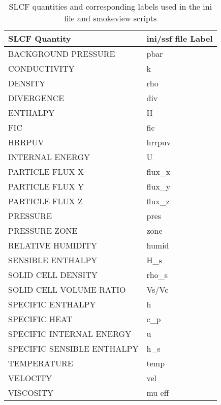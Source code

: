 \begin{table}[bph]
\begin{center}
\caption{SLCF quantities and corresponding labels used in the ini file and smokeview scripts}
\vspace{0.1in}
\begin{tabular}{|l|l|}
\hline
SLCF Quantity & ini/ssf file Label \\ \hline
{\ct  BACKGROUND PRESSURE } & {\ct   pbar } \\ \hline
{\ct  CONDUCTIVITY } & {\ct   k } \\ \hline
{\ct  DENSITY } & {\ct   rho } \\ \hline
{\ct  DIVERGENCE } & {\ct   div } \\ \hline
{\ct  ENTHALPY } & {\ct   H } \\ \hline
{\ct  FIC } & {\ct   fic } \\ \hline
{\ct  HRRPUV } & {\ct   hrrpuv } \\ \hline
{\ct  INTERNAL ENERGY } & {\ct   U } \\ \hline
{\ct  PARTICLE FLUX X } & {\ct   flux\_x } \\ \hline
{\ct  PARTICLE FLUX Y } & {\ct   flux\_y } \\ \hline
{\ct  PARTICLE FLUX Z } & {\ct   flux\_z } \\ \hline
{\ct  PRESSURE } & {\ct   pres } \\ \hline
{\ct  PRESSURE ZONE } & {\ct   zone } \\ \hline
{\ct  RELATIVE HUMIDITY } & {\ct   humid } \\ \hline
{\ct  SENSIBLE ENTHALPY } & {\ct   H\_s } \\ \hline
{\ct  SOLID CELL DENSITY } & {\ct   rho\_s } \\ \hline
{\ct  SOLID CELL VOLUME RATIO } & {\ct   Vs/Vc } \\ \hline
{\ct  SPECIFIC ENTHALPY } & {\ct   h } \\ \hline
{\ct  SPECIFIC HEAT } & {\ct   c\_p } \\ \hline
{\ct  SPECIFIC INTERNAL ENERGY } & {\ct   u } \\ \hline
{\ct  SPECIFIC SENSIBLE ENTHALPY } & {\ct   h\_s } \\ \hline
{\ct  TEMPERATURE } & {\ct   temp } \\ \hline
{\ct  VELOCITY } & {\ct   vel } \\ \hline
{\ct  VISCOSITY } & {\ct   mu eff } \\ \hline
\end{tabular}
\label{tabSLCF}
\end{center}
\end{table}
